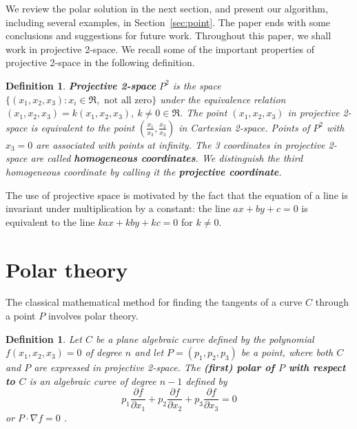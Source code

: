 \documentclass[twocolumn,10pt]{article}
\newtheorem{defn2}[theorem]{Definition}
\begin{document}


\begin{figure*}
\hspace{.7in} \setjjpolf
\caption{The tangent space of a curve, and its dual (clipped to $x \in [-1,1]$)}
\label{fig:duality}
\end{figure*}

We review the polar solution in the next section,
and present our algorithm, including several examples, 
in Section~\ref{sec:point}.
The paper ends with some conclusions and suggestions for future work.
Throughout this paper, we shall work in projective 2-space.
We recall some of the important properties of projective 2-space 
in the following definition.

\begin{defn2}
\label{defn:proj}
{\bf Projective 2-space} $P^2$ is the space 
$\{(x_1,x_2,x_3) : x_i \in \Re, \mbox{ not all zero}\}$
under the equivalence relation $(x_1,x_2,x_3) = k(x_1,x_2,x_3),\ k \neq 0 \in \Re$.
The point $(x_1,x_2,x_3)$ in projective 2-space
is equivalent to the point $(\frac{x_1}{x_3},\frac{x_2}{x_3})$
in Cartesian 2-space.
Points of $P^2$ with $x_3=0$ are associated with points at infinity.
The 3 coordinates in projective 2-space are called {\bf homogeneous coordinates}.
We distinguish the third homogeneous coordinate by calling it the 
{\bf projective coordinate}.
\end{defn2}

The use of projective space is motivated by the fact that the equation 
of a line is invariant under multiplication by a constant:
the line $ax+by+c=0$ is equivalent to the line $kax+kby+kc=0$ 
for $k \neq 0$.

\section{Polar theory}
\label{sec:polar}

The classical mathematical method for finding the tangents of a curve $C$
through a point $P$ involves polar theory.

\begin{defn2}
Let $C$ be a plane algebraic curve defined by the polynomial $f(x_1,x_2,x_3)=0$
of degree $n$ and let $P = (p_1,p_2,p_3)$ be a point, where both $C$ and $P$ 
are expressed in projective 2-space.
The {\bf (first) polar of $P$ with respect to $C$} 
is an algebraic curve of degree $n-1$ defined by
\[
	p_1 \frac{\partial f}{\partial x_1} +
	p_2 \frac{\partial f}{\partial x_2} +
	p_3 \frac{\partial f}{\partial x_3} = 0
\]
or $P \cdot \nabla f = 0$ \cite{semple85}.	%
\end{defn2}
\end{document}
